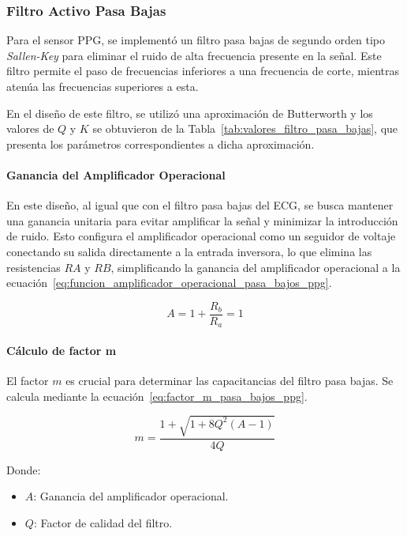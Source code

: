         \subsubsection{Filtro Activo Pasa Bajas}
        Para el sensor PPG, se implementó un filtro pasa bajas de segundo orden tipo \textit{Sallen-Key}
        para eliminar el ruido de alta frecuencia presente en la señal. Este filtro permite el paso de frecuencias inferiores a una frecuencia de corte, mientras atenúa las frecuencias superiores a esta.

        En el diseño de este filtro, se utilizó una aproximación de Butterworth y los valores de $Q$ y $K$ se obtuvieron de la Tabla~\ref{tab:valores_filtro_pasa_bajas}, que presenta los parámetros correspondientes a dicha aproximación.

        \paragraph{Ganancia del Amplificador Operacional}
        En este diseño, al igual que con el filtro pasa bajas del ECG, se busca mantener una ganancia unitaria para evitar amplificar la señal y minimizar la introducción de ruido. Esto configura el amplificador operacional como un seguidor de voltaje conectando su salida directamente a la entrada inversora, lo que elimina las resistencias $RA$ y $RB$, simplificando la ganancia del amplificador operacional a la ecuación~\ref{eq:funcion_amplificador_operacional_pasa_bajos_ppg}.

        \begin{equation}
            \label{eq:funcion_amplificador_operacional_pasa_bajos_ppg}
            A = 1 + \frac{R_b}{R_a} = 1
        \end{equation}

        \paragraph{Cálculo de factor m}
        El factor $m$ es crucial para determinar las capacitancias del filtro pasa bajas. Se calcula mediante la ecuación~\ref{eq:factor_m_pasa_bajos_ppg}.

        \begin{equation}
            \label{eq:factor_m_pasa_bajos_ppg}
            m = \frac{1+\sqrt{1+8Q^2(A-1)}}{4Q}
        \end{equation}

        Donde:

        \begin{itemize}
            \item $A$: Ganancia del amplificador operacional.
            \item $Q$: Factor de calidad del filtro.
        \end{itemize}

